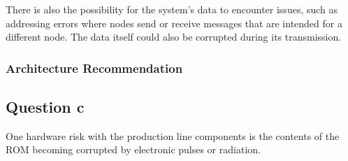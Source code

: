 \documentclass[]{report}
\begin{document}
				There is also the possibility for the system's data to encounter issues, such as addressing errors where nodes send or receive messages that are intended for a different node. The data itself could also be corrupted during its transmission.
				
				\subsubsection{Architecture Recommendation}
						
			
			\subsection{Question c}
			One hardware risk with the production line components is the contents of the ROM becoming corrupted by electronic pulses or radiation.


	
	
\end{document}
